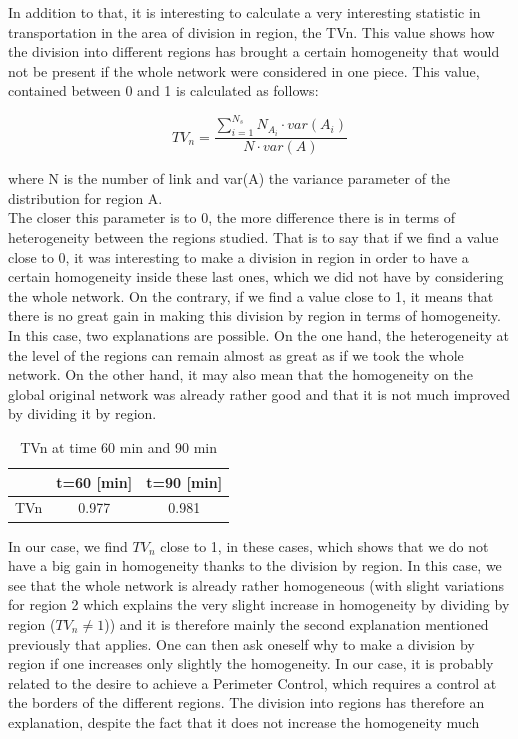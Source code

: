 \documentclass[a4paper, 12pt,oneside]{article}
\begin{document}
\bigbreak
In addition to that, it is interesting to calculate a very interesting statistic in transportation in the area of division in region, the TVn. This value shows how the division into different regions has brought a certain homogeneity that would not be present if the whole network were considered in one piece. This value, contained between 0 and 1 is calculated as follows: 

\begin{equation}
       TV_n = \frac{\sum^{N_s}_{i=1}{N_{A_i} \cdot var(A_i) }}{N \cdot var(A)} 
    \label{TV_n}
\end{equation}

where N is the number of link and var(A) the variance parameter of the distribution for region A.\\

The closer this parameter is to 0, the more difference there is in terms of heterogeneity between the regions studied. That is to say that if we find a value close to 0, it was interesting to make a division in region in order to have a certain homogeneity inside these last ones, which we did not have by considering the whole network.
\smallbreak
On the contrary, if we find a value close to 1, it means that there is no great gain in making this division by region in terms of homogeneity. In this case, two explanations are possible. On the one hand, the heterogeneity at the level of the regions can remain almost as great as if we took the whole network. On the other hand, it may also mean that the homogeneity on the global original network was already rather good and that it is not much improved by dividing it by region.
\begin{table}[H]
\begin{center}
\begin{tabular}{|c|c|c|}
\hline    & t=60 [min] & t=90 [min] \\
\hline TVn & 0.977 & 0.981 \\
\hline
\end{tabular}
\caption{TVn at time 60 min and 90 min}
\label{TVn at time 60 min and 90 min}
\end{center}
\end{table}
In our case, we find $TV_n$ close to 1, in these cases, which shows that we do not have a big gain in homogeneity thanks to the division by region. In this case, we see that the whole network is already rather homogeneous (with slight variations for region 2 which explains the very slight increase in homogeneity by dividing by region ($TV_n \ne 1$)) and it is therefore mainly the second explanation mentioned previously that applies. 
\smallbreak
One can then ask oneself why to make a division by region if one increases only slightly the homogeneity. In our case, it is probably related to the desire to achieve a Perimeter Control, which requires a control at the borders of the different regions. The division into regions has therefore an explanation, despite the fact that it does not increase the homogeneity much 
\end{document}
